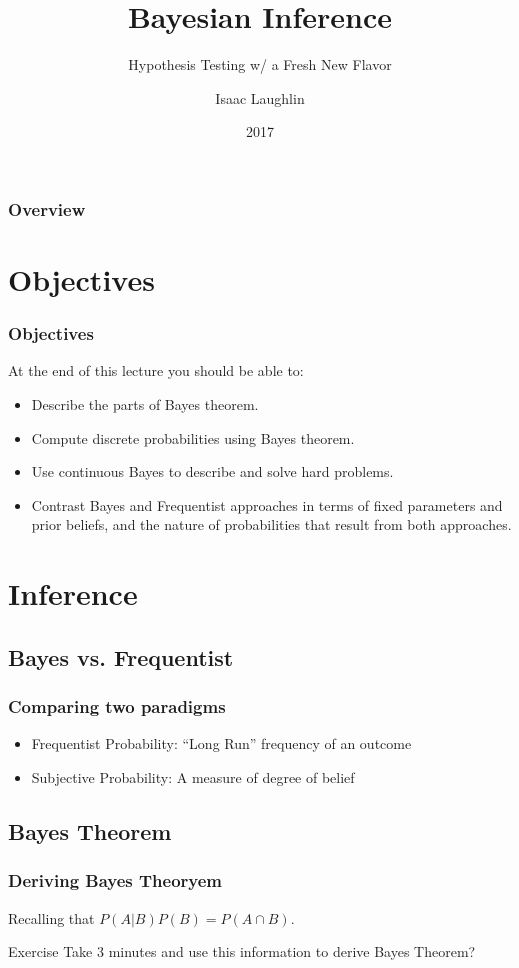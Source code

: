 \documentclass{beamer}
\title{Bayesian Inference}
\subtitle{Hypothesis Testing w/ a Fresh New Flavor}
\author{Isaac Laughlin}
\institute{Galvanize}
\date{2017}
\begin{document}
\frame{\titlepage}

\begin{frame}
  \frametitle{Overview}
  \tableofcontents[]
\end{frame}

\section{Objectives}
\begin{frame}
  \frametitle{Objectives}
  At the end of this lecture you should be able to:
  \begin{itemize}
  \item Describe the parts of Bayes theorem.
  \item Compute discrete probabilities using Bayes theorem.
  \item Use continuous Bayes to describe and solve hard problems.
  \item Contrast Bayes and Frequentist approaches in terms of fixed parameters and prior beliefs, and the nature of probabilities that result from both approaches.
  \end{itemize}
\end{frame}

\section{Inference}
\subsection{Bayes vs. Frequentist}
\begin{frame}
  \frametitle{Comparing two paradigms}
  \begin{itemize}
  \item Frequentist Probability: ``Long Run'' frequency of an outcome
  \item Subjective Probability: A measure of degree of belief
  \end{itemize}
  
\end{frame}

\subsection{Bayes Theorem}
\begin{frame}
  \frametitle{Deriving Bayes Theoryem}
  Recalling that $P(A|B)P(B) = P(A \cap B)$.

  \begin{block}
    {Exercise}
    Take 3 minutes and use this information to derive Bayes Theorem?
  \end{block}
\end{frame}
\end{document}
